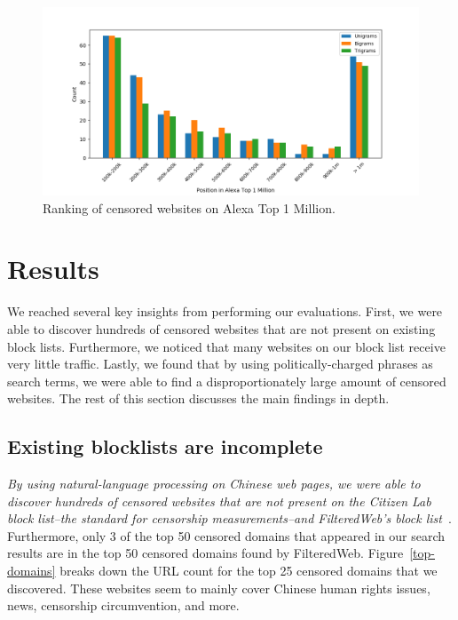 \begin{figure}[t]
  \centering
  \includegraphics[scale=0.6]{figures/alexa}
  \caption{\label{alexa}Ranking of censored websites on Alexa Top 1 Million.}
\end{figure}

\section{Results}
We reached several key insights from performing our
evaluations. First, we were able to discover hundreds of
censored websites that are not present on existing block
lists. Furthermore, we noticed that many websites on our block list
receive very little traffic. Lastly, we found that by using
politically-charged phrases as search terms, we were able to find a
disproportionately large amount of censored websites. The rest of this
section discusses the main findings in depth.

\subsection{Existing blocklists are incomplete}
\textit{By using natural-language processing on Chinese web pages, we
were able to discover hundreds of censored websites that are not
present on the Citizen Lab block list--the standard for censorship
measurements--and FilteredWeb's block list~\cite{darer2017filteredweb,
citizenlab:block}}. Furthermore, only 3 of the top 50 censored domains
that appeared in our search results are in the top 50 censored domains
found by FilteredWeb. Figure~\ref{top-domains} breaks down the URL
count for the top 25 censored domains that we discovered. These
websites seem to mainly cover Chinese human rights issues, news,
censorship circumvention, and more.

